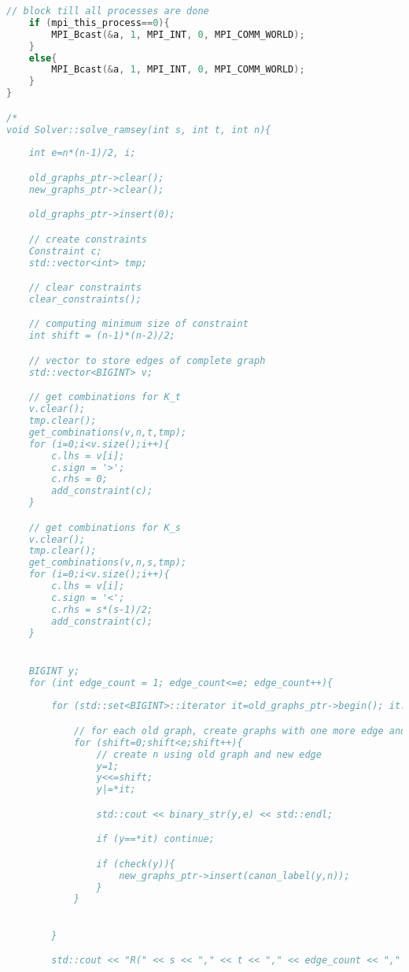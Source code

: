 \documentclass[12pt]{etsu_thesis}
\begin{document}
\begin{lstlisting}[language=C++]
    // block till all processes are done
    if (mpi_this_process==0){
        MPI_Bcast(&a, 1, MPI_INT, 0, MPI_COMM_WORLD);
    }
    else{
        MPI_Bcast(&a, 1, MPI_INT, 0, MPI_COMM_WORLD);
    }
}

/*
void Solver::solve_ramsey(int s, int t, int n){
    
    int e=n*(n-1)/2, i;

    old_graphs_ptr->clear();
    new_graphs_ptr->clear();

    old_graphs_ptr->insert(0);

    // create constraints
    Constraint c;
    std::vector<int> tmp;

    // clear constraints
    clear_constraints();

    // computing minimum size of constraint
    int shift = (n-1)*(n-2)/2;

    // vector to store edges of complete graph
    std::vector<BIGINT> v;    

    // get combinations for K_t 
    v.clear();
    tmp.clear();
    get_combinations(v,n,t,tmp);
    for (i=0;i<v.size();i++){
        c.lhs = v[i];
        c.sign = '>';
        c.rhs = 0;
        add_constraint(c);
    }

    // get combinations for K_s 
    v.clear();
    tmp.clear();    
    get_combinations(v,n,s,tmp);
    for (i=0;i<v.size();i++){
        c.lhs = v[i];
        c.sign = '<';
        c.rhs = s*(s-1)/2;
        add_constraint(c);
    }    


    BIGINT y;
    for (int edge_count = 1; edge_count<=e; edge_count++){
        
        for (std::set<BIGINT>::iterator it=old_graphs_ptr->begin(); it!=old_graphs_ptr->end(); ++it){

            // for each old graph, create graphs with one more edge and check
            for (shift=0;shift<e;shift++){
                // create n using old graph and new edge
                y=1;
                y<<=shift;
                y|=*it;

                std::cout << binary_str(y,e) << std::endl;

                if (y==*it) continue;

                if (check(y)){
                    new_graphs_ptr->insert(canon_label(y,n));
                }                
            }
        

        }

        std::cout << "R(" << s << "," << t << "," << edge_count << "," << n << ") = " << new_graphs_ptr->size() << std::endl;


\end{lstlisting}
\end{document}
